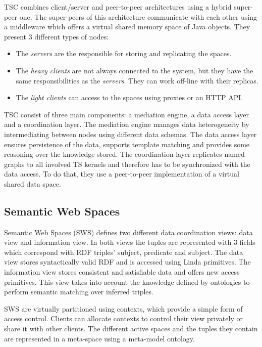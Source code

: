 TSC combines client/server and peer-to-peer architectures using a hybrid super-peer one.
The super-peers of this architecture communicate with each other using a middleware which offers a virtual shared memory space of Java objects.
They present 3 different types of nodes:
\begin{itemize}
  \item The \emph{servers} are the responsible for storing and replicating the spaces.
  \item The \emph{heavy clients} are not always connected to the system, but they have the same responsibilities as the \emph{servers}.
	They can work off-line with their replicas.
  \item The \emph{light clients} can access to the spaces using proxies or an HTTP API.
\end{itemize}


TSC consist of three main components: a mediation engine, a data access layer and a coordination layer.
The mediation engine manages data heterogeneity by intermediating between nodes using different data schemas.
The data access layer ensures persistence of the data, supports template matching and provides some reasoning over the knowledge stored.
The coordination layer replicates named graphs to all involved TS kernels and therefore has to be synchronized with the data access.
To do that, they use a peer-to-peer implementation of a virtual shared data space. %



\subsection{Semantic Web Spaces}

Semantic Web Spaces (SWS) defines two different data coordination views: data view and information view.
In both views the tuples are represented with 3 fields which correspond with RDF triples' subject, predicate and subject.
The data view stores syntactically valid RDF and is accessed using Linda primitives.
The information view stores consistent and satisfiable data and offers new access primitives.
This view takes into account the knowledge defined by ontologies to perform semantic matching over inferred triples.

SWS are virtually partitioned using contexts, which provide a simple form of access control.
Clients can allocate contexts to control their view privately or share it with other clients. %
The different active spaces and the tuples they contain are represented in a meta-space using a meta-model ontology.

